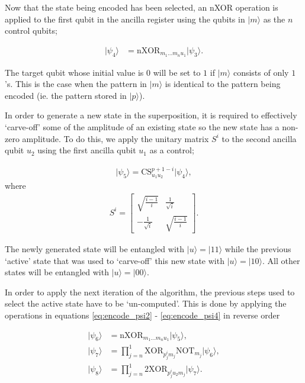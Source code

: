 Now that the state being encoded has been selected, an \textrm{nXOR} operation is applied to the first qubit in the ancilla register using the qubits in $\vert m \rangle$ as the $n$ control qubits;

\begin{align}
\label{eq:encode_psi4}
	\vert \psi_4 \rangle & =  \textrm{nXOR}_{m_1\dots m_n u_1}  \vert \psi_3 \rangle.
\end{align}

\noindent The target qubit whose initial value is $0$ will be set to $1$ if $\vert m \rangle$ consists of only $1$'s. This is the case when the pattern in $\vert m \rangle$ is identical to the pattern being encoded (ie. the pattern stored in $\vert p \rangle$).

In order to generate a new state in the superposition, it is required to effectively `carve-off' some of the amplitude of an existing state so the new state has a non-zero amplitude. To do this, we apply the unitary matrix $S^i$ to the second ancilla qubit $u_2$ using the first ancilla qubit $u_1$ as a control;

\begin{align}
\vert \psi_5 \rangle  =  \textrm{CS}_{u_1 u_2}^{p+1-i}  \vert \psi_4 \rangle,
\end{align}
\noindent where
\begin{align}
S^i = 
\begin{bmatrix}
\sqrt{\frac{i-1}{i}} & \frac{1}{\sqrt{i}} \\
-\frac{1}{\sqrt{i}}  & \sqrt{\frac{i-1}{i}}
\end{bmatrix}.
\end{align}

\noindent The newly generated state will be entangled with $\vert u\rangle = \vert 11 \rangle$ while the previous `active' state that was used to `carve-off' this new state with $\vert u\rangle = \vert 10 \rangle$. All other states will be entangled with $\vert u\rangle = \vert 00 \rangle$. 

In order to apply the next iteration of the algorithm, the previous steps used to select the active state have to be `un-computed'. This is done by applying the operations in equations \eqref{eq:encode_psi2} - \eqref{eq:encode_psi4} in reverse order

\begin{align}
	\vert \psi_6 \rangle & =  \textrm{nXOR}_{m_1\dots m_n u_1}  \vert \psi_5 \rangle    ,                               \\
	\vert \psi_7 \rangle & =  \prod\limits_{j=n}^{1} \textrm{XOR}_{p_j^i m_j} \textrm{NOT}_{m_j}  \vert \psi_6 \rangle, \\
	\vert \psi_8 \rangle & =  \prod\limits_{j=n}^{1} 2\textrm{XOR}_{p_j^i u_2 m_j} \vert \psi_7 \rangle.
\end{align}

